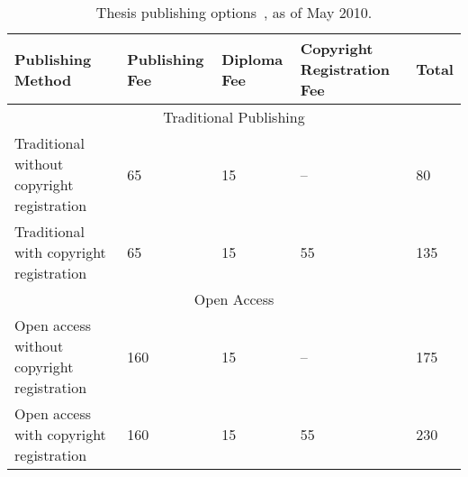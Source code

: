 \begin{table}[htbp]
\centering
\caption[Thesis Publishing Options]{Thesis publishing options~\cite{mudd2009}, as of May 2010. }
\label{table:pastwork:publishing}
\begin{tabular}{p{} p{} p{} p{} p{}}
\toprule
\textbf{Publishing Method} & \textbf{Publishing Fee}
 & \textbf{Diploma Fee} & \textbf{Copyright Registration Fee} & \textbf{Total} \\
\midrule
\multicolumn{5}{c}{Traditional Publishing}\\
\midrule

Traditional without copyright registration
& 65 & 15 & -- & 80 \\[0.2em]

Traditional with copyright registration
& 65 & 15 & 55 & 135 \\[0.2em]

\midrule
\multicolumn{5}{c}{Open Access}\\
\midrule

Open access without copyright registration
& 160 & 15 & -- & 175 \\[0.2em]

Open access with copyright registration
& 160 & 15 & 55 & 230 \\

\bottomrule
\end{tabular}
\end{table}
